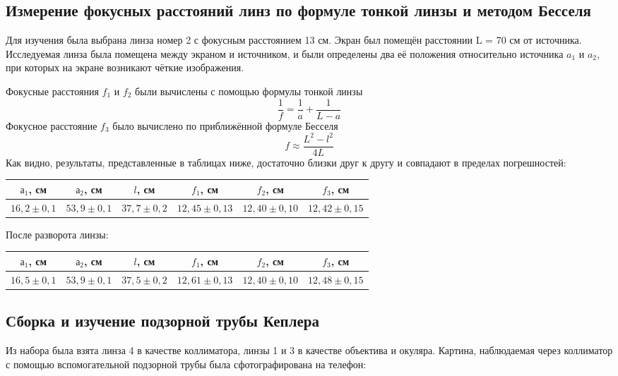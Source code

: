 \documentclass[12pt,a4paper]{article}
\begin{document}
\subsection*{Измерение фокусных расстояний линз по формуле тонкой линзы и методом Бесселя}

Для изучения была выбрана линза номер 2 с фокусным расстоянием 13 см. Экран был помещён расстоянии L = 70 см от источника.
Исследуемая линза была помещена между экраном и источником, и были определены два её положения относительно источника $a_1$ и $a_2$, при которых на экране возникают чёткие изображения.

Фокусные расстояния $f_1$ и $f_2$ были вычислены с помощью формулы тонкой линзы
\[ \dfrac{1}{f} = \dfrac{1}{a} + \dfrac{1}{L - a} \]
Фокусное расстояние $f_3$ было вычислено по приближённой формуле Бесселя
\[ f \approx \dfrac{L^2 - l^2}{4L} \]
Как видно, результаты, представленные в таблицах ниже, достаточно близки друг к другу и совпадают в пределах погрешностей:


\begin{table}[H]
\begin{tabular}{|c|c|c|c|c|c|}
\hline
$а_1$, см      & $а_2$, см      & $l$, см    & $f_1$, см    & $f_2$, см   & $f_3$, см    \\ \hline
$16,2\pm0,1$ & $53,9\pm0,1$ & $37,7\pm0,2$ & $12,45\pm0,13$ & $12,40\pm0,10$ & $12,42\pm0,15$ \\ \hline
\end{tabular}
\end{table}

После разворота линзы:
\begin{table}[H]
\begin{tabular}{|c|c|c|c|c|c|}
\hline
$а_1$, см      & $а_2$, см      & $l$, см    & $f_1$, см    & $f_2$, см   & $f_3$, см    \\ \hline
$16,5\pm0,1$ & $53,9\pm0,1$ & $37,5\pm0,2$ & $12,61\pm0,13$ & $12,40\pm0,10$ & $12,48\pm0,15$ \\ \hline
\end{tabular}
\end{table}


\subsection*{Сборка и изучение подзорной трубы Кеплера}

Из набора была взята линза 4 в качестве коллиматора, линзы 1 и 3 в качестве объектива и окуляра.
Картина, наблюдаемая через коллиматор с помощью вспомогательной подзорной трубы была сфотографирована на телефон:
\end{document}
